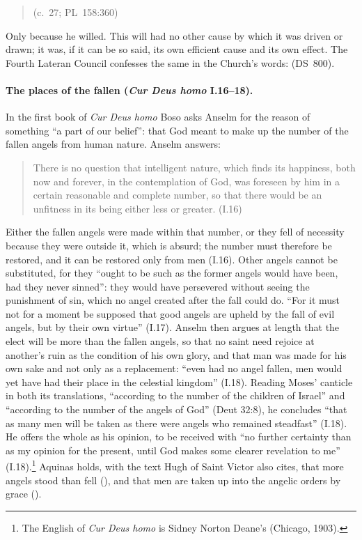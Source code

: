 \begin{quote}
 (c.~27; PL~158:360)
\end{quote}

\noindent Only because he willed. This will had no other cause by which it
was driven or drawn; it was, if it can be so said, its own efficient cause
and its own effect. The Fourth Lateran Council confesses the same in the
Church's words:  (DS~800).

\paragraph{The places of the fallen (\emph{Cur Deus homo} I.16--18).} In the
first book of \emph{Cur Deus homo} Boso asks Anselm for the reason of
something ``a part of our belief'': that God meant to make up the number of
the fallen angels from human nature. Anselm answers:

\begin{quote}
There is no question that intelligent nature, which finds its happiness,
both now and forever, in the contemplation of God, was foreseen by him in a
certain reasonable and complete number, so that there would be an unfitness
in its being either less or greater. (I.16)
\end{quote}

\noindent Either the fallen angels were made within that number, or they
fell of necessity because they were outside it, which is absurd; the number
must therefore be restored, and it can be restored only from men (I.16).
Other angels cannot be substituted, for they ``ought to be such as the
former angels would have been, had they never sinned'': they would have
persevered without seeing the punishment of sin, which no angel created
after the fall could do. ``For it must not for a moment be supposed that
good angels are upheld by the fall of evil angels, but by their own virtue''
(I.17). Anselm then argues at length that the elect will be more than the
fallen angels, so that no saint need rejoice at another's ruin as the
condition of his own glory, and that man was made for his own sake and not
only as a replacement: ``even had no angel fallen, men would yet have had
their place in the celestial kingdom'' (I.18). Reading Moses' canticle in
both its translations, ``according to the number of the children of Israel''
and ``according to the number of the angels of God'' (Deut 32:8), he
concludes ``that as many men will be taken as there were angels who remained
steadfast'' (I.18). He offers the whole as his opinion, to be received with ``no
further certainty than as my opinion for the present, until God makes some
clearer revelation to me'' (I.18).\footnote{The English of \emph{Cur Deus
homo} is Sidney Norton Deane's (Chicago, 1903).} Aquinas holds, with the text
Hugh of Saint Victor also cites, that more angels stood than fell
(), and that men are taken up into the angelic orders by
grace ().


